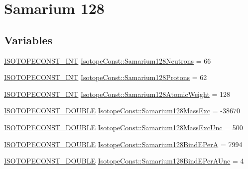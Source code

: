 \hypertarget{group___isotope_const-_samarium-_sm128}{}\section{Samarium 128}
\label{group___isotope_const-_samarium-_sm128}
\subsection*{Variables}
\begin{DoxyCompactItemize}
\item 
\mbox{\hyperlink{group___isotope_const-_macros_ga5f18360b3e99483a35c32d789e62621c}{I\+S\+O\+T\+O\+P\+E\+C\+O\+N\+S\+T\+\_\+\+I\+NT}} \mbox{\hyperlink{group___isotope_const-_samarium-_sm128_gafc7786092a073c85960a887ce3585ab3}{Isotope\+Const\+::\+Samarium128\+Neutrons}} = 66
\item 
\mbox{\hyperlink{group___isotope_const-_macros_ga5f18360b3e99483a35c32d789e62621c}{I\+S\+O\+T\+O\+P\+E\+C\+O\+N\+S\+T\+\_\+\+I\+NT}} \mbox{\hyperlink{group___isotope_const-_samarium-_sm128_gade966e44b887153c043600ac82ba7df2}{Isotope\+Const\+::\+Samarium128\+Protons}} = 62
\item 
\mbox{\hyperlink{group___isotope_const-_macros_ga5f18360b3e99483a35c32d789e62621c}{I\+S\+O\+T\+O\+P\+E\+C\+O\+N\+S\+T\+\_\+\+I\+NT}} \mbox{\hyperlink{group___isotope_const-_samarium-_sm128_ga5d816c97d9907313e9a48e6a6a2d5610}{Isotope\+Const\+::\+Samarium128\+Atomic\+Weight}} = 128
\item 
\mbox{\hyperlink{group___isotope_const-_macros_ga8f45a7272ce02c0b4c65c44636ed719a}{I\+S\+O\+T\+O\+P\+E\+C\+O\+N\+S\+T\+\_\+\+D\+O\+U\+B\+LE}} \mbox{\hyperlink{group___isotope_const-_samarium-_sm128_ga515589ed68ae281d56b41bf3b1f08271}{Isotope\+Const\+::\+Samarium128\+Mass\+Exc}} = -\/38670
\item 
\mbox{\hyperlink{group___isotope_const-_macros_ga8f45a7272ce02c0b4c65c44636ed719a}{I\+S\+O\+T\+O\+P\+E\+C\+O\+N\+S\+T\+\_\+\+D\+O\+U\+B\+LE}} \mbox{\hyperlink{group___isotope_const-_samarium-_sm128_ga11194ef5f71b3f4726ed533ec18ef3cb}{Isotope\+Const\+::\+Samarium128\+Mass\+Exc\+Unc}} = 500
\item 
\mbox{\hyperlink{group___isotope_const-_macros_ga8f45a7272ce02c0b4c65c44636ed719a}{I\+S\+O\+T\+O\+P\+E\+C\+O\+N\+S\+T\+\_\+\+D\+O\+U\+B\+LE}} \mbox{\hyperlink{group___isotope_const-_samarium-_sm128_gaa5a1d08b3ab9eb6dd2518490b53ae819}{Isotope\+Const\+::\+Samarium128\+Bind\+E\+PerA}} = 7994
\item 
\mbox{\hyperlink{group___isotope_const-_macros_ga8f45a7272ce02c0b4c65c44636ed719a}{I\+S\+O\+T\+O\+P\+E\+C\+O\+N\+S\+T\+\_\+\+D\+O\+U\+B\+LE}} \mbox{\hyperlink{group___isotope_const-_samarium-_sm128_ga7e8ffebfce4d47be20a080c0f7bb132c}{Isotope\+Const\+::\+Samarium128\+Bind\+E\+Per\+A\+Unc}} = 4

\end{DoxyCompactItemize}
